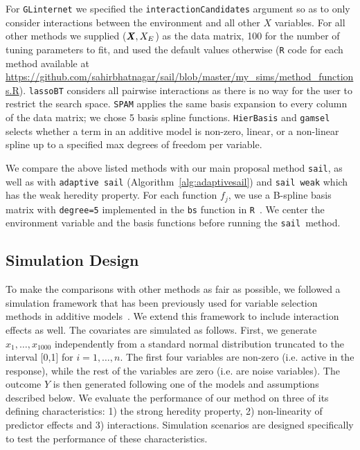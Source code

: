 \documentclass[useAMS,usenatbib,referee]{biom}
\newcommand{\sail}{\texttt{sail}}
\newcommand{\bX}{\textbf{\emph{X}}}
\begin{document}
For \texttt{GLinternet} we specified the \texttt{interactionCandidates} argument so as to only consider interactions between the environment and all other $X$ variables. For all other methods we supplied ($\bX, X_E$) as the data matrix, 100 for the number of tuning parameters to fit, and used the default values otherwise (\texttt{R} code for each method available at \url{https://github.com/sahirbhatnagar/sail/blob/master/my_sims/method_functions.R}). \texttt{lassoBT} considers all pairwise interactions as there is no way for the user to restrict the search space. \texttt{SPAM} applies the same basis expansion to every column of the data matrix; we chose 5 basis spline functions. \texttt{HierBasis} and \texttt{gamsel} selects whether a term in an additive model is non-zero, linear, or a non-linear spline up to a specified max degrees of freedom per variable.

We compare the above listed methods with our main proposal method \texttt{sail}, as well as with \texttt{adaptive sail} (Algorithm~\ref{alg:adaptivesail}) and \texttt{sail weak} which has the weak heredity property. 
For each function $f_j$, we use a B-spline basis matrix with \texttt{degree=5} implemented in the \texttt{bs} function in \texttt{R}~\citep{cran}. 
We center the environment variable and the basis functions before running the \sail ~method.


\subsection{Simulation Design}
To make the comparisons with other methods as fair as possible, we followed a simulation framework that has been previously used for variable selection methods in additive models~\citep{lin2006component,huang2010variable}.
We extend this framework to include interaction effects as well.
The covariates are simulated as follows. 
First, we generate $x_1,\ldots, x_{1000}$ independently from a standard normal distribution truncated to the interval [0,1] for $i=1,\ldots,n$. 
The first four variables are non-zero (i.e. active in the response), while the rest of the variables are zero (i.e. are noise variables). 
The outcome $Y$ is then generated following one of the models and assumptions described below. We evaluate the performance of our method on three of its defining characteristics: 1) the strong heredity property, 2) non-linearity of predictor effects and 3) interactions. 
Simulation scenarios are designed specifically to test the performance of these characteristics.
\end{document}
